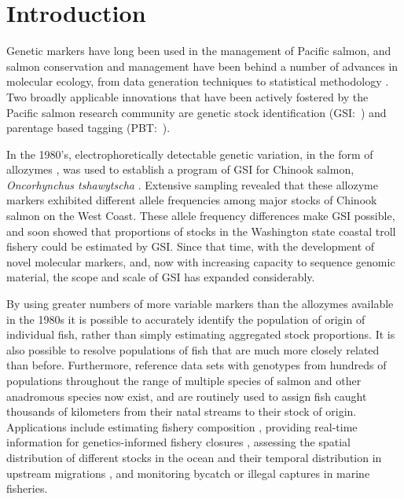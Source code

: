 
\section*{Introduction}

Genetic markers have long been used in the 
management of Pacific salmon, and salmon conservation and management have been
behind a number of advances in molecular ecology,
from data generation techniques \citep{clemento2011discovery,campbell2015genotyping,mckinney2017managing}
to statistical methodology
\citep{smouse1990genetic,anderson2002model,pella2006gibbs}.
Two broadly applicable innovations that have been
actively fostered by the Pacific salmon research community are genetic
stock identification
(GSI:~\citealt{milner1982genetic,beacham2004dna,seeb2007development})
and parentage based tagging
(PBT:~\citealt{anderson2006power, garza2007large, abadia2013large, steele2013validation}).  



 In the 1980's, electrophoretically
detectable genetic variation, in the form of allozymes
\citep{ayala1972allozymes,allendorf1981use}, was used to
establish a program of GSI for Chinook salmon,
{\em Oncorhynchus tshawytscha} \citep{milner1982genetic}.  Extensive sampling
revealed that these allozyme markers
exhibited different allele frequencies among major stocks of Chinook salmon on the West Coast.
These allele frequency differences make GSI possible, and
\citet{milner1985genetic} soon showed that proportions of stocks in
the Washington state coastal troll fishery could be estimated by GSI.
Since that time, with the development of novel molecular markers, and, now
with increasing capacity to sequence genomic material, the scope and scale of GSI
has expanded considerably.

By using greater numbers of more variable markers than the allozymes available
in the 1980s it is possible to accurately
identify the population of origin of individual fish, rather than simply estimating
aggregated stock proportions.  It is also possible to resolve populations of fish that
are much more closely related than before.  Furthermore, reference data sets with genotypes
from hundreds of populations throughout the range of multiple species of salmon and
other anadromous species
\citep{seeb2007development,gilbey2018microsatellite,barclay2019genetic} now exist, and are routinely used to assign fish caught thousands of
kilometers from their natal streams to their stock of origin. Applications include estimating fishery
composition \citep{satterthwaite2015stock}, providing real-time information for genetics-informed fishery closures \citep{beacham2004dna}, assessing the spatial distribution of different stocks in the
ocean \citep{urawa2009stock} and their temporal distribution in upstream migrations
\citep{hess2014monitoring},  and monitoring  bycatch \citep{hasselman2016genetic} or illegal captures \citep{wilmot1999origins} in marine fisheries.

